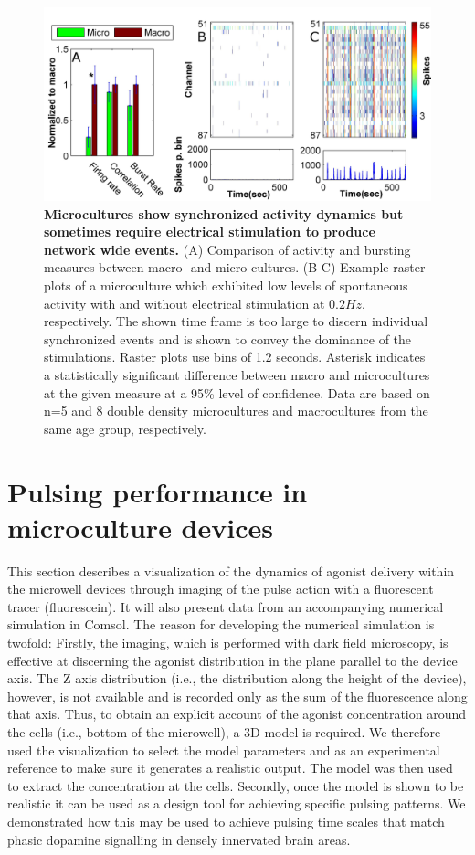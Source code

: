    \begin{figure}[h]
       \centering
       \includegraphics[width=15cm]{chapter6/figures/microcultureStimControl/microcultureStimControl.jpg}
       \caption[Spontaneous and evoked activity in microcultures]{\textbf{Microcultures show synchronized activity dynamics but sometimes require electrical stimulation to produce network wide events.} (A) Comparison of activity and bursting measures between macro- and micro-cultures. (B-C) Example raster plots of a microculture which exhibited low levels of spontaneous activity with and without electrical stimulation at \(0.2 Hz\), respectively. The shown time frame is too large to discern individual synchronized events and is shown to convey the dominance of the stimulations. Raster plots use bins of 1.2 seconds. Asterisk indicates a statistically significant difference between macro and microcultures at the given measure at a 95\% level of confidence. Data are based on n=5 and 8 double density microcultures and macrocultures from the same age group, respectively.}
       \label{fig:pulses:microcultureStimControl}
   \end{figure}

\section{Pulsing performance in microculture devices}
This section describes a visualization of the dynamics of agonist delivery within the microwell devices through imaging of the pulse action with a fluorescent tracer (fluorescein). It will also present data from an accompanying numerical simulation in Comsol. The reason for developing the numerical simulation is twofold: Firstly, the imaging, which is performed with dark field microscopy, is effective at discerning the agonist distribution in the plane parallel to the device axis. The Z axis distribution (i.e., the distribution along the height of the device), however, is not available and is recorded only as the sum of the fluorescence along that axis. Thus, to obtain an explicit account of the agonist concentration around the cells (i.e., bottom of the microwell), a 3D model is required. We therefore used the visualization to select the model parameters and as an experimental reference to make sure it generates a realistic output. The model was then used to extract the concentration at the cells. Secondly, once the model is shown to be realistic it can be used as a design tool for achieving specific pulsing patterns. We demonstrated how this may be used to achieve pulsing time scales that match phasic dopamine signalling in densely innervated brain areas.


